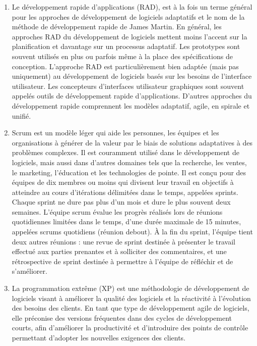 \begin{enumerate}
    \item Le développement rapide d'applications\cite{rapid_application_development} (RAD), est à la fois un terme général pour les approches de développement de
    logiciels adaptatifs et le nom de la méthode de développement rapide de James Martin.
    En général, les approches RAD du développement de logiciels mettent moins l'accent sur
    la planification et davantage sur un processus adaptatif. Les prototypes sont souvent utilisés
    en plus ou parfois même à la place des spécifications de conception.
    L'approche RAD est particulièrement bien adaptée (mais pas uniquement) au développement de
    logiciels basés sur les besoins de l'interface utilisateur. Les concepteurs d'interfaces
    utilisateur graphiques sont souvent appelés outils de développement rapide d'applications.
    D'autres approches du développement rapide comprennent les modèles adaptatif, agile, en spirale et unifié.

    \item Scrum\cite{scrum_software_development} est un modèle léger qui aide les personnes, les équipes et les organisations à générer
    de la valeur par le biais de solutions adaptatives à des problèmes complexes.
    Il est couramment utilisé dans le développement de logiciels, mais aussi dans
    d'autres domaines tels que la recherche, les ventes, le marketing, l'éducation et
    les technologies de pointe. Il est conçu pour des équipes de dix membres ou moins qui
    divisent leur travail en objectifs à atteindre au cours d'itérations délimitées dans le temps,
    appelées sprints. Chaque sprint ne dure pas plus d'un mois et dure le plus souvent deux semaines.
    L'équipe scrum évalue les progrès réalisés lors de réunions quotidiennes limitées dans le temps,
    d'une durée maximale de 15 minutes, appelées scrums quotidiens (réunion debout).
    À la fin du sprint, l'équipe tient deux autres réunions : une revue de sprint destinée à
    présenter le travail effectué aux parties prenantes et à solliciter des commentaires, et
    une rétrospective de sprint destinée à permettre à l'équipe de réfléchir et de s'améliorer.

    \item La programmation extrême\cite{extreme_programming} (XP) est une méthodologie de développement de logiciels
    visant à améliorer la qualité des logiciels et la réactivité à l'évolution des besoins des
    clients. En tant que type de développement agile de logiciels, elle préconise des versions
    fréquentes dans des cycles de développement courts, afin d'améliorer la productivité et
    d'introduire des points de contrôle permettant d'adopter les nouvelles exigences des clients.


\end{enumerate}
